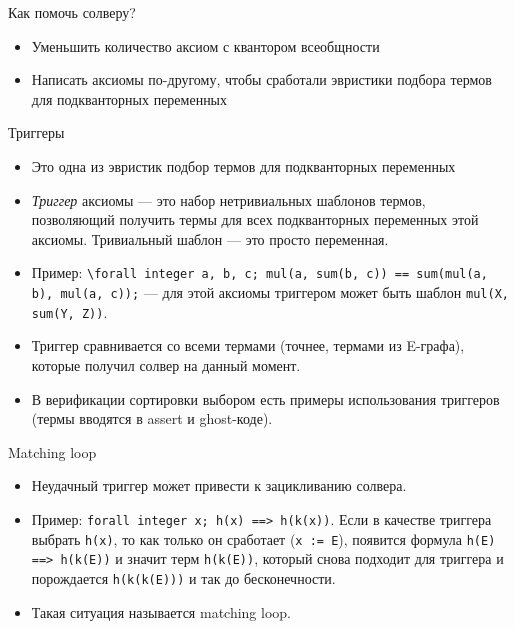 \documentclass[hyperref={unicode=true}]{beamer}
\begin{document}
    \begin{frame}{Как помочь солверу?}
    \begin{itemize}
    \item Уменьшить количество аксиом с квантором всеобщности
    \item Написать аксиомы по-другому, чтобы сработали эвристики подбора термов для подкванторных переменных
    \end{itemize}
    \end{frame}

    \begin{frame}{Триггеры}
    \begin{itemize}
    \item Это одна из эвристик подбор термов для подкванторных переменных
    \item \emph{Триггер} аксиомы --- это набор нетривиальных шаблонов термов, позволяющий получить термы для всех подкванторных
    переменных этой аксиомы. Тривиальный шаблон --- это просто переменная.
    \item Пример: \texttt{\textbackslash forall integer a, b, c; mul(a, sum(b, c)) == sum(mul(a, b), mul(a, c));}
    --- для этой аксиомы триггером может быть шаблон \texttt{mul(X, sum(Y, Z))}.
    \item Триггер сравнивается со всеми термами (точнее, термами из E-графа), которые получил солвер на данный момент.
    \item В верификации сортировки выбором есть примеры использования триггеров (термы вводятся в assert и ghost-коде).
    \end{itemize}
    \end{frame}

    \begin{frame}{Matching loop}
    \begin{itemize}
    \item Неудачный триггер может привести к зацикливанию солвера.
    \item Пример: \texttt{forall integer x; h(x) ==> h(k(x))}. Если в качестве триггера выбрать \texttt{h(x)}, то как только
    он сработает (\texttt{x := E}), появится формула \texttt{h(E) ==> h(k(E))} и значит терм \texttt{h(k(E))}, который снова
    подходит для триггера и порождается \texttt{h(k(k(E)))} и так до бесконечности.
    \item Такая ситуация называется matching loop.
    \end{itemize}
    \end{frame}
\end{document}
